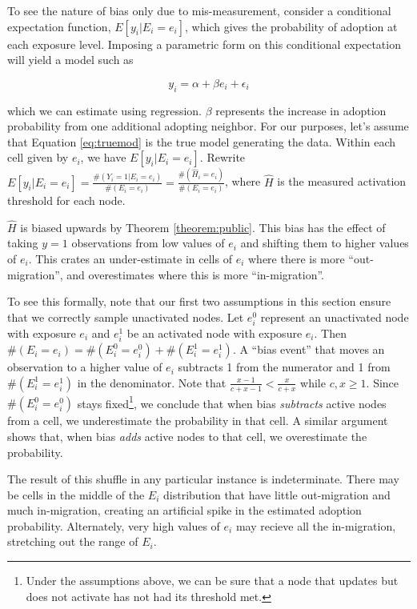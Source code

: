 \documentclass[a4paper]{article}
\begin{document}
To see the nature of bias only due to mis-measurement, consider a conditional expectation function, $E[y_i | E_i = e_i]$, which gives the probability of adoption at each exposure level. Imposing a parametric form on this conditional expectation will yield a model such as 

\begin{equation} \label{eq:truemod}
y_i = \alpha + \beta e_i + \epsilon_i
\end{equation}

\noindent
which we can estimate using regression. $\beta$ represents the increase in adoption probability from one additional adopting neighbor. For our purposes, let's assume that Equation \ref{eq:truemod} is the true model generating the data. Within each cell given by $e_i$, we have $E[y_i | E_i = e_i]$. Rewrite $E[y_i | E_i = e_i] = \frac{\#(Y_i = 1 | E_i = e_i)}{\#(E_i = e_i)} = \frac{\#(\hat{H}_i = e_i)}{\#(E_i = e_i)}$, where $\hat{H}$ is the measured activation threshold for each node.

$\hat{H}$ is biased upwards by Theorem \ref{theorem:public}. This bias has the effect of taking $y = 1$ observations from low values of $e_i$ and shifting them to higher values of $e_i$. This crates an under-estimate in cells of $e_i$ where there is more ``out-migration'', and overestimates where this is more ``in-migration''.

To see this formally, note that our first two assumptions in this section ensure that we correctly sample unactivated nodes. Let $e_i^0$ represent an unactivated node with exposure $e_i$ and $e_i^1$ be an activated node with exposure $e_i$. Then $\#(E_i = e_i) = \#(E_i^0 = e_i^0) + \#(E_i^1 = e_i^1)$. A ``bias event'' that moves an observation to a higher value of $e_i$ subtracts 1 from the numerator and 1 from $\#(E_i^1 = e_i^1)$ in the denominator. Note that $\frac{x - 1}{c + x - 1} < \frac{x}{c + x}$ while $c, x \ge 1$. Since $\#(E_i^0 = e_i^0)$ stays fixed\footnote{Under the assumptions above, we can be sure that a node that updates but does not activate has not had its threshold met.}, we conclude that when bias \emph{subtracts} active nodes from a cell, we underestimate the probability in that cell. A similar argument shows that, when bias \emph{adds} active nodes to that cell, we overestimate the probability.

The result of this shuffle in any particular instance is indeterminate. There may be cells in the middle of the $E_i$ distribution that have little out-migration and much in-migration, creating an artificial spike in the estimated adoption probability. Alternately, very high values of $e_i$ may recieve all the in-migration, stretching out the range of $E_i$.
\end{document}

